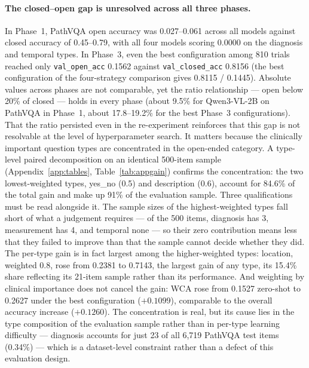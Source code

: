 \paragraph{The closed--open gap is unresolved across all three phases.}
In Phase~1, PathVQA open accuracy was 0.027--0.061 across all models against
closed accuracy of 0.45--0.79, with all four models scoring 0.0000 on the
diagnosis and temporal types. In Phase~3, even the best configuration among 810
trials reached only \texttt{val\_open\_acc} 0.1562 against
\texttt{val\_closed\_acc} 0.8156 (the best configuration of the four-strategy
comparison gives 0.8115 / 0.1445). Absolute values across phases are not
comparable, yet the ratio relationship --- open below 20\% of closed --- holds in
every phase (about 9.5\% for Qwen3-VL-2B on PathVQA in Phase~1, about
17.8--19.2\% for the best Phase~3 configurations). That the ratio persisted even
in the re-experiment reinforces that this gap is not resolvable at the level of
hyperparameter search. It matters because the clinically important question types
are concentrated in the open-ended category. A type-level paired decomposition on
an identical 500-item sample (Appendix~\ref{app:tables},
Table~\ref{tab:appgain}) confirms the concentration: the two lowest-weighted
types, yes\_no (0.5) and description (0.6), account for 84.6\% of the total gain
and make up 91\% of the evaluation sample. Three qualifications must be read
alongside it. The sample sizes of the highest-weighted types fall short of what a
judgement requires --- of the 500 items, diagnosis has 3, measurement has 4, and
temporal none --- so their zero contribution means less that they failed to
improve than that the sample cannot decide whether they did. The per-type gain is
in fact largest among the higher-weighted types: location, weighted 0.8, rose
from 0.2381 to 0.7143, the largest gain of any type, its 15.4\% share reflecting
its 21-item sample rather than its performance. And weighting by clinical
importance does not cancel the gain: WCA rose from 0.1527 zero-shot to 0.2627
under the best configuration ($+0.1099$), comparable to the overall accuracy
increase ($+0.1260$). The concentration is real, but its cause lies in the type
composition of the evaluation sample rather than in per-type learning difficulty
--- diagnosis accounts for just 23 of all 6,719 PathVQA test items (0.34\%) ---
which is a dataset-level constraint rather than a defect of this evaluation
design.


